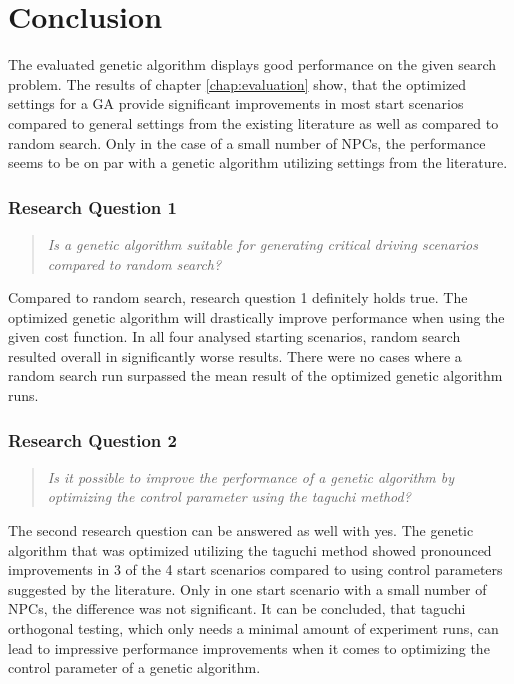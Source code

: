\chapter{Conclusion}
The evaluated genetic algorithm displays good performance on the given search problem. The results of chapter \ref{chap:evaluation} show, that the optimized settings for a GA provide significant improvements in most start scenarios compared to general settings from the existing literature as well as compared to random search. Only in the case of a small number of NPCs, the performance seems to be on par with a genetic algorithm utilizing settings from the literature.

\subsection{Research Question 1}
\begin{quote}
	\begin{em}
		\textit{Is a genetic algorithm suitable for generating critical driving scenarios compared to random search?}
	\end{em}
\end{quote}

Compared to random search, research question 1 definitely holds true. The optimized genetic algorithm will drastically improve performance when using the given cost function. In all four analysed starting scenarios, random search resulted overall in significantly worse results. There were no cases where a random search run surpassed the mean result of the optimized genetic algorithm runs.

\subsection{Research Question 2}
\begin{quote}
	\begin{em}
		\textit{Is it possible to improve the performance of a genetic algorithm by optimizing the control parameter using the taguchi method?}
	\end{em}
\end{quote}

The second research question can be answered as well with yes. The genetic algorithm that was optimized utilizing the taguchi method showed pronounced improvements in 3 of the 4 start scenarios compared to using control parameters suggested by the literature. Only in one start scenario with a small number of NPCs, the difference was not significant. It can be concluded, that taguchi orthogonal testing, which only needs a minimal amount of experiment runs, can lead to impressive performance improvements when it comes to optimizing the control parameter of a genetic algorithm.
